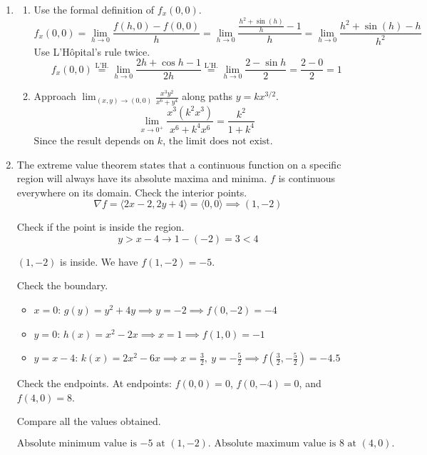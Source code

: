 \documentclass[a4paper, 12pt]{article}
\begin{document}
\begin{enumerate}[leftmargin=*,label=\textbf{\arabic*.}]
Substitute $\frac{\partial v}{\partial y}$.

\[\boxed{\frac{\partial u}{\partial y} = \frac{1 - 2\cos(1)}{4}}\]

\item \begin{enumerate}[label=\textbf{\alph*.}]
    \item Use the formal definition of $f_x(0,0)$.
    \[f_x(0,0) = \lim_{h \to 0} \frac{f(h,0) - f(0,0)}{h} = \lim_{h \to 0} \frac{\frac{h^2 + \sin(h)}{h} - 1}{h} = \lim_{h \to 0} \frac{h^2 + \sin(h) - h}{h^2}\]
    Use L'Hôpital's rule twice.
    \[f_x(0,0) \overset{\text{L'H.}}= \lim_{h\to0}\frac{2h+\cos h-1}{2h}\overset{\text{L'H.}}= \lim_{h\to0}\frac{2-\sin h}{2}=\frac{2-0}2=\boxed1\]
    \item Approach $\displaystyle\lim_{(x,y)\to(0,0)} \frac{x^3 y^2}{x^6 + y^4}$ along paths $y = k x^{3/2}$.
    \[\lim_{x \to 0^+} \frac{x^3 (k^2 x^3)}{x^6 + k^4 x^6} = \frac{k^2}{1 + k^4}\]
    Since the result depends on $k$, $\boxed{\text{the limit does not exist}}$.
\end{enumerate}

\item The extreme value theorem states that a continuous function on a specific region will always have its absolute maxima and minima. $f$ is continuous everywhere on its domain. Check the interior points.
\[\nabla f = \langle 2x - 2, 2y + 4 \rangle = \langle 0, 0 \rangle \implies (1, -2)\]

Check if the point is inside the region.
\[y > x -4\longrightarrow 1 - (-2) = 3 < 4\]

$(1,-2)$ is inside. We have $f(1,-2) = -5$.

Check the boundary.
\begin{itemize}[leftmargin=*]
    \item $x=0$: $g(y) = y^2 + 4y \implies y = -2 \implies f(0,-2) = -4$
    \item $y=0$: $h(x) = x^2 - 2x \implies x = 1 \implies f(1,0) = -1$
    \item $y = x - 4$: $k(x) = 2x^2 - 6x \implies x = \frac{3}{2},\: y = -\frac{5}{2} \implies f\left(\frac{3}{2}, -\frac{5}{2}\right) = -4.5$
\end{itemize}

Check the endpoints. At endpoints: $f(0,0) = 0$, $f(0,-4) = 0$, and $f(4,0) = 8$.

Compare all the values obtained.

\[\boxed{\text{Absolute minimum value is }{-5}\text{ at }(1,-2).\text{ Absolute maximum value is }8\text{ at }(4,0).}\]

\end{enumerate}
\end{document}
